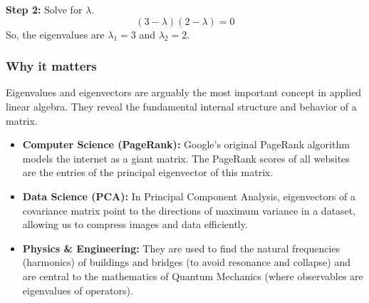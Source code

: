 \textbf{Step 2:} Solve for $\lambda$.
\[ (3 - \lambda)(2 - \lambda) = 0 \]
So, the eigenvalues are $\lambda_1 = 3$ and $\lambda_2 = 2$.

\subsubsection*{Why it matters}
Eigenvalues and eigenvectors are arguably the most important concept in applied linear algebra. They reveal the fundamental internal structure and behavior of a matrix.
\begin{itemize}[leftmargin=*]
    \item \textbf{Computer Science (PageRank):} Google's original PageRank algorithm models the internet as a giant matrix. The PageRank scores of all websites are the entries of the principal eigenvector of this matrix.
    \item \textbf{Data Science (PCA):} In Principal Component Analysis, eigenvectors of a covariance matrix point to the directions of maximum variance in a dataset, allowing us to compress images and data efficiently.
    \item \textbf{Physics \& Engineering:} They are used to find the natural frequencies (harmonics) of buildings and bridges (to avoid resonance and collapse) and are central to the mathematics of Quantum Mechanics (where observables are eigenvalues of operators).
\end{itemize}
